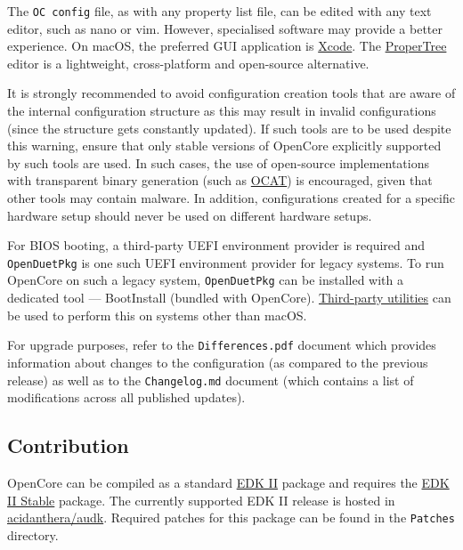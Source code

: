 \documentclass[]{article}
\makeatletter
\renewcommand{\label}[1]{%
\zref@wrapper@immediate{\oldlabel{#1}}}  %
\makeatother
\begin{document}
The \texttt{OC\ config} file, as with any property list file, can be edited with
any text editor, such as nano or vim. However, specialised software
may provide a better experience. On macOS, the preferred GUI application is
\href{https://developer.apple.com/xcode}{Xcode}. The
\href{https://github.com/corpnewt/ProperTree}{ProperTree} editor
is a lightweight, cross-platform and open-source alternative.

It is strongly recommended to avoid configuration creation tools that are aware of the
internal configuration structure as this may result in invalid configurations (since the
structure gets constantly updated). If such tools are to be used despite this warning,
ensure that only stable versions of OpenCore explicitly supported by such tools are used.
In such cases, the use of open-source implementations with transparent binary generation
(such as \href{https://github.com/ic005k/QtOpenCoreConfig}{OCAT}) is encouraged, given
that other tools may contain malware. In addition, configurations created for a specific
hardware setup should never be used on different hardware setups.

For BIOS booting, a third-party UEFI environment provider is required and
\texttt{OpenDuetPkg} is one such UEFI environment provider for legacy systems.
To run OpenCore on such a legacy system, \texttt{OpenDuetPkg} can be installed
with a dedicated tool --- BootInstall (bundled with OpenCore).
\href{https://github.com/corpnewt/gibMacOS}{Third-party utilities} can be used
to perform this on systems other than macOS.

For upgrade purposes, refer to the \texttt{Differences.pdf} document which provides
information about changes to the configuration (as compared to the previous release)
as well as to the \texttt{Changelog.md} document (which contains a list of
modifications across all published updates).

\subsection{Contribution}\label{configuration-comp}

OpenCore can be compiled as a standard
\href{https://github.com/tianocore/tianocore.github.io/wiki/EDK-II}{EDK II}
package and requires the
\href{https://github.com/tianocore/tianocore.github.io/wiki/EDK-II#stable-tags}{EDK II Stable}
package. The currently supported EDK II release is hosted in
\href{https://github.com/acidanthera/audk}{acidanthera/audk}. Required patches
for this package can be found in the \texttt{Patches} directory.
\end{document}
